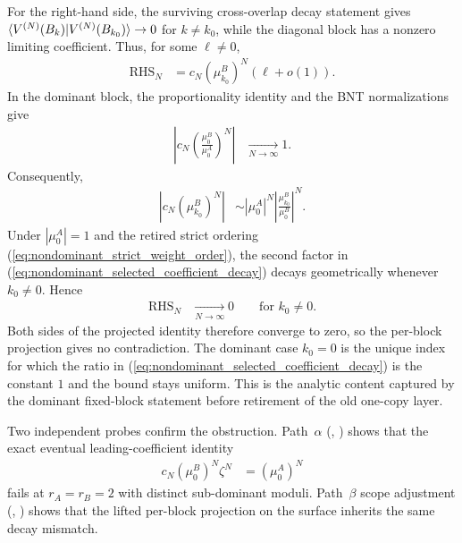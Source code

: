 \documentclass{article}
\begin{document}
For the right-hand side, the surviving cross-overlap decay statement
gives
$\langle V^{(N)}(B_k) | V^{(N)}(B_{k_0}) \rangle\to 0$ for $k\ne k_0$, while the
diagonal block has a nonzero limiting coefficient. Thus, for some
$\ell\ne 0$,
\begin{align}
    \mathrm{RHS}_N
        &=c_N(\mu^B_{k_0})^N(\ell+o(1)).
    \label{eq:nondominant_projected_rhs_asymptotic}
\end{align}
In the dominant block, the proportionality identity and the BNT
normalizations give
\begin{align}
    \left|c_N\left(\frac{\mu^B_0}{\mu^A_0}\right)^N\right|
        &\xrightarrow[N\to\infty]{}1.
    \label{eq:nondominant_dominant_adjusted_scalar_limit}
\end{align}
Consequently,
\begin{align}
    \left|c_N(\mu^B_{k_0})^N\right|
        &\sim
        |\mu^A_0|^N
        \left|\frac{\mu^B_{k_0}}{\mu^B_0}\right|^N.
    \label{eq:nondominant_selected_coefficient_decay}
\end{align}
Under $|\mu^A_0|=1$ and the retired strict ordering
(\ref{eq:nondominant_strict_weight_order}), the second factor in
(\ref{eq:nondominant_selected_coefficient_decay}) decays geometrically whenever
$k_0\ne 0$. Hence
\begin{align}
    \mathrm{RHS}_N
        &\xrightarrow[N\to\infty]{}0
        \qquad\text{for }k_0\ne 0.
    \label{eq:nondominant_projected_rhs_decay}
\end{align}
Both sides of the projected identity therefore converge to zero, so the
per-block projection gives no contradiction. The dominant case $k_0=0$ is the
unique index for which the ratio in
(\ref{eq:nondominant_selected_coefficient_decay}) is the constant $1$ and the
bound stays uniform. This is the analytic content captured by the dominant
fixed-block statement before retirement of the old one-copy layer.

Two independent probes confirm the obstruction. Path~$\alpha$
(,
) shows that the exact eventual leading-coefficient identity
\begin{align}
    c_N(\mu^B_0)^N\zeta^N
        &=(\mu^A_0)^N
    \label{eq:nondominant_exact_leading_coefficient_probe}
\end{align}
fails at $r_A=r_B=2$ with distinct sub-dominant moduli. Path~$\beta$ scope
adjustment
(,
) shows that the lifted per-block projection on the
 surface inherits the same decay mismatch.
\end{document}
